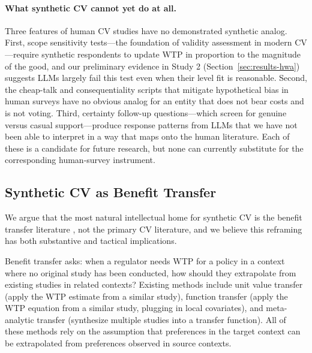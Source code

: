 \documentclass[12pt]{article}
\begin{document}
\paragraph{What synthetic CV cannot yet do at all.} Three features of
human CV studies have no demonstrated synthetic analog. First, scope
sensitivity tests---the foundation of validity assessment in modern CV
\parencite{Johnston2017}---require synthetic respondents to update WTP
in proportion to the magnitude of the good, and our preliminary evidence
in Study 2 (Section~\ref{sec:results-hwa}) suggests LLMs largely fail
this test even when their level fit is reasonable. Second, the
cheap-talk and consequentiality scripts that mitigate hypothetical bias
in human surveys have no obvious analog for an entity that does not bear
costs and is not voting. Third, certainty follow-up questions---which
screen for genuine versus casual support---produce response patterns
from LLMs that we have not been able to interpret in a way that maps
onto the human literature. Each of these is a candidate for future
research, but none can currently substitute for the corresponding
human-survey instrument.

\subsection{Synthetic CV as Benefit Transfer}\label{sec:disc-benefit-transfer}

We argue that the most natural intellectual home for synthetic CV is the
benefit transfer literature \parencite{Rosenberger2017, Loomis2015, Boyle2010},
not the primary CV literature, and we believe this reframing has both
substantive and tactical implications.

Benefit transfer asks: when a regulator needs WTP for a policy in a
context where no original study has been conducted, how should they
extrapolate from existing studies in related contexts? Existing methods
include unit value transfer (apply the WTP estimate from a similar
study), function transfer (apply the WTP equation from a similar study,
plugging in local covariates), and meta-analytic transfer (synthesize
multiple studies into a transfer function). All of these methods rely on
the assumption that preferences in the target context can be
extrapolated from preferences observed in source contexts.
\end{document}
